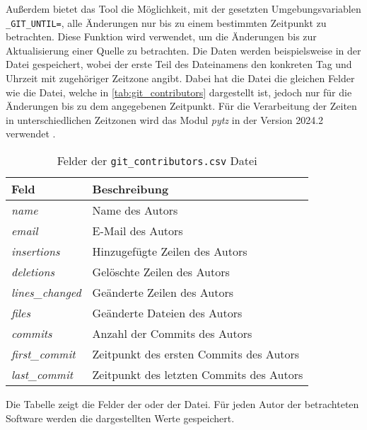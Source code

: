 Außerdem bietet das Tool die Möglichkeit, mit der gesetzten Umgebungsvariablen \texttt{\_GIT\_UNTIL=}, alle Änderungen nur bis zu einem bestimmten Zeitpunkt zu betrachten.
Diese Funktion wird verwendet, um die Änderungen bis zur Aktualisierung einer Quelle zu betrachten.
Die Daten werden beispielsweise in der Datei  gespeichert, wobei der erste Teil des Dateinamens den konkreten Tag und Uhrzeit mit zugehöriger Zeitzone angibt.
Dabei hat die Datei die gleichen Felder wie die  Datei, welche in \autoref{tab:git_contributors} dargestellt ist, jedoch nur für die Änderungen bis zu dem angegebenen Zeitpunkt.
Für die Verarbeitung der Zeiten in unterschiedlichen Zeitzonen wird das Modul \emph{pytz} in der Version 2024.2 verwendet \autocite{bishop_stub42pytz_2024}.

\begin{table}
    \begin{tabularx}{\textwidth}{XL{10.2cm}}
        \toprule
        \textbf{Feld}         & \textbf{Beschreibung}                   \\ \midrule
        \emph{name}           & Name des Autors                         \\
        \emph{email}          & E-Mail des Autors                       \\
        \emph{insertions}     & Hinzugefügte Zeilen des Autors          \\
        \emph{deletions}      & Gelöschte Zeilen des Autors             \\
        \emph{lines\_changed} & Geänderte Zeilen des Autors             \\
        \emph{files}          & Geänderte Dateien des Autors            \\
        \emph{commits}        & Anzahl der Commits des Autors           \\
        \emph{first\_commit}  & Zeitpunkt des ersten Commits des Autors \\
        \emph{last\_commit}  & Zeitpunkt des letzten Commits des Autors \\
        \bottomrule
    \end{tabularx}
    \caption{Felder der \texttt{git\_contributors.csv} Datei}
    \label{tab:git_contributors}
    \small
    Die Tabelle zeigt die Felder der  oder der  Datei. Für jeden Autor der betrachteten Software werden die dargestellten Werte gespeichert.
\end{table}
